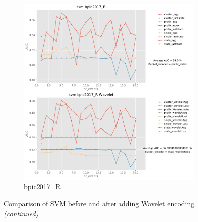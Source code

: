 \documentclass[twoside,11pt]{Latex/Classes/PhDthesisPSnPDF}
\begin{document}
\begin{figure}[!htbp]
	\medskip
	\begin{subfigure}{0.48\textwidth}
		\includegraphics[width=\linewidth]{images/wavelet/graphs2svm/bpic2017_R.pdf}	
		\caption{bpic2017\_R} 
	\end{subfigure}\hspace*{\fill}
	\caption{Comparison of SVM before and after adding Wavelet encoding \textit{(continued)}}
	\label{fig:ws3}
\end{figure}















\end{document}
